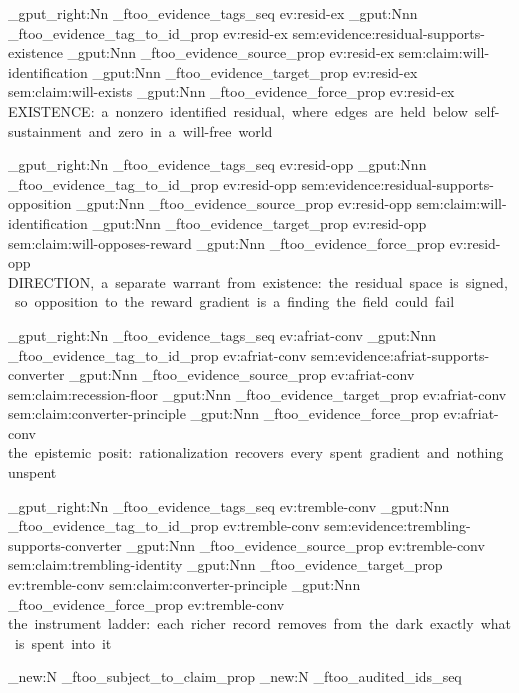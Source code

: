 \seq_gput_right:Nn \g_ftoo_evidence_tags_seq { ev:resid-ex }
\prop_gput:Nnn \g_ftoo_evidence_tag_to_id_prop { ev:resid-ex } { sem:evidence:residual-supports-existence }
\prop_gput:Nnn \g_ftoo_evidence_source_prop { ev:resid-ex } { sem:claim:will-identification }
\prop_gput:Nnn \g_ftoo_evidence_target_prop { ev:resid-ex } { sem:claim:will-exists }
\prop_gput:Nnn \g_ftoo_evidence_force_prop { ev:resid-ex } { EXISTENCE:~a~nonzero~identified~residual,~where~edges~are~held~below~self-sustainment~and~zero~in~a~will-free~world }

\seq_gput_right:Nn \g_ftoo_evidence_tags_seq { ev:resid-opp }
\prop_gput:Nnn \g_ftoo_evidence_tag_to_id_prop { ev:resid-opp } { sem:evidence:residual-supports-opposition }
\prop_gput:Nnn \g_ftoo_evidence_source_prop { ev:resid-opp } { sem:claim:will-identification }
\prop_gput:Nnn \g_ftoo_evidence_target_prop { ev:resid-opp } { sem:claim:will-opposes-reward }
\prop_gput:Nnn \g_ftoo_evidence_force_prop { ev:resid-opp } { DIRECTION,~a~separate~warrant~from~existence:~the~residual~space~is~signed,~so~opposition~to~the~reward~gradient~is~a~finding~the~field~could~fail }

\seq_gput_right:Nn \g_ftoo_evidence_tags_seq { ev:afriat-conv }
\prop_gput:Nnn \g_ftoo_evidence_tag_to_id_prop { ev:afriat-conv } { sem:evidence:afriat-supports-converter }
\prop_gput:Nnn \g_ftoo_evidence_source_prop { ev:afriat-conv } { sem:claim:recession-floor }
\prop_gput:Nnn \g_ftoo_evidence_target_prop { ev:afriat-conv } { sem:claim:converter-principle }
\prop_gput:Nnn \g_ftoo_evidence_force_prop { ev:afriat-conv } { the~epistemic~posit:~rationalization~recovers~every~spent~gradient~and~nothing~unspent }

\seq_gput_right:Nn \g_ftoo_evidence_tags_seq { ev:tremble-conv }
\prop_gput:Nnn \g_ftoo_evidence_tag_to_id_prop { ev:tremble-conv } { sem:evidence:trembling-supports-converter }
\prop_gput:Nnn \g_ftoo_evidence_source_prop { ev:tremble-conv } { sem:claim:trembling-identity }
\prop_gput:Nnn \g_ftoo_evidence_target_prop { ev:tremble-conv } { sem:claim:converter-principle }
\prop_gput:Nnn \g_ftoo_evidence_force_prop { ev:tremble-conv } { the~instrument~ladder:~each~richer~record~removes~from~the~dark~exactly~what~is~spent~into~it }



\prop_new:N \g_ftoo_subject_to_claim_prop
\seq_new:N \g_ftoo_audited_ids_seq



